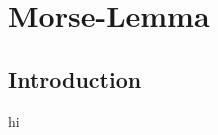 \chapter{Morse-Lemma}
\label{chap:MorseLemma}

\section{Introduction}
\label{sec:MorseLemma_introduction}


\begin{definition}
    \label{def:quadratic form}
    
    hi

  \end{definition}
  